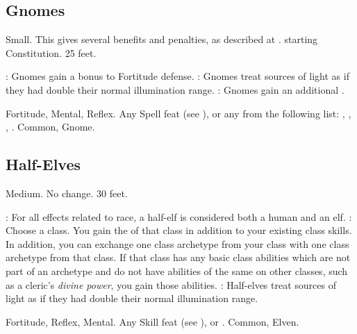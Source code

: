 \subsection{Gnomes}
 Small. This gives several benefits and penalties, as described at .
  starting Constitution.
 25 feet.
\begin{itemize}
    : Gnomes gain a  bonus to Fortitude defense.
    : Gnomes treat sources of light as if they had double their normal illumination range.
    : Gnomes gain an additional .
\end{itemize}
  Fortitude,  Mental,  Reflex.
 Any Spell feat (see ), or any from the following list: , , , .
 Common, Gnome.

\subsection{Half-Elves}
 Medium.
 No change.
 30 feet.
\begin{itemize}
    : For all effects related to race, a half-elf is considered both a human and an elf.
    : Choose a class.
        You gain the  of that class in addition to your existing class skills.
        In addition, you can exchange one class archetype from your class with one class archetype from that class.
        If that class has any basic class abilities which are not part of an archetype and do not have abilities of the same on other classes, such as a cleric's \textit{divine power}, you gain those abilities.
    : Half-elves treat sources of light as if they had double their normal illumination range.
\end{itemize}
  Fortitude, Reflex, Mental.
 Any Skill feat (see ), or .
 Common, Elven.

